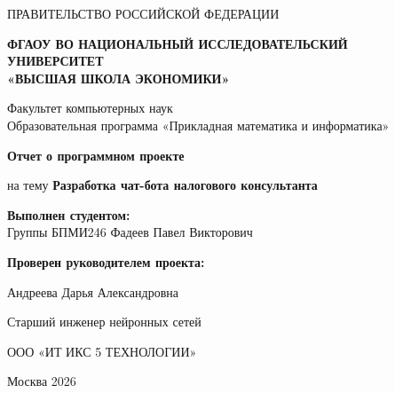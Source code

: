 \documentclass[a4paper,12pt]{article}
\begin{document}
\begin{titlepage}
\thispagestyle{empty}

\begin{center}
ПРАВИТЕЛЬСТВО РОССИЙСКОЙ ФЕДЕРАЦИИ

\vspace{0.8cm}

\textbf{ФГАОУ ВО НАЦИОНАЛЬНЫЙ ИССЛЕДОВАТЕЛЬСКИЙ}\\
\textbf{УНИВЕРСИТЕТ}\\
\textbf{«ВЫСШАЯ ШКОЛА ЭКОНОМИКИ»}

\vspace{1.5cm}

Факультет компьютерных наук\\
Образовательная программа «Прикладная математика и информатика»

\vspace{4.0cm}

{\Large \textbf{Отчет о программном проекте}}

\vspace{1.8cm}

\begin{minipage}{0.92\textwidth}
\noindent на тему \textbf{Разработка чат-бота налогового консультанта}

\end{minipage}

\end{center}

\vspace{2.5cm}

\begin{flushleft}
\textbf{Выполнен студентом:}\\
Группы БПМИ246  Фадеев Павел Викторович

\vspace{2.2cm}

\textbf{Проверен руководителем проекта:}

\vspace{0.9cm}

Андреева Дарья Александровна

\vspace{0.9cm}

Старший инженер нейронных сетей

\vspace{0.9cm}

ООО «ИТ ИКС 5 ТЕХНОЛОГИИ»
\end{flushleft}

\vfill

\begin{center}
Москва 2026
\end{center}

\end{titlepage}
\end{document}
